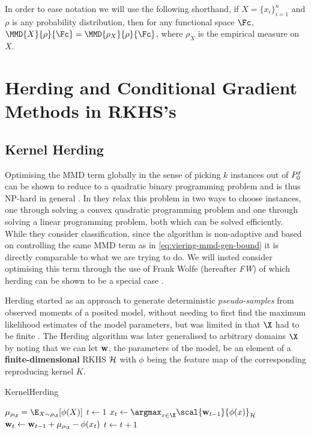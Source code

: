 In order to ease notation we will use the following shorthand, if \(X =
\{x_i\}_{i=1}^n\) and \(\rho\) is any probability distribution, then for any
functional space \(\Fc\), \(\MMD{X}{\rho}{\Fc} =
\MMD{\rho_X}{\rho}{\Fc}\), where \(\rho_X\) is the empirical measure
on \(X\).

\section{Herding and Conditional Gradient Methods in RKHS's}
\subsection{Kernel Herding}
Optimising the MMD term globally in the sense of
picking \(k\) instances out of \(P^x_{0}\) can be shown to reduce to a
quadratic binary programming problem and is thus NP-hard in general
\cite{chaovalitwongse09_quadr_integ_progr}. In
\cite{chattopadhyay13_batch_mode_activ_sampl_based} they relax this problem in
two ways to choose instances, one through solving a convex quadratic programming
problem and one through solving a linear programming problem, both which can be
solved efficiently. While they consider classification, since the algorithm is
non-adaptive and based on controlling the same MMD term as in
\ref{eq:viering-mmd-gen-bound} it is directly comparable to what we are trying
to do. We will insted consider optimising this term through the use of
Frank Wolfe \cite{frank56_algor_quadr_progr,jaggi13_revis_frank_wolfe}
(hereafter \textit{FW}) of which
herding can be shown to be a special case
\cite{bach12_equiv_between_herdin_condit_gradien_algor}.

Herding started as an approach to generate deterministic \emph{pseudo-samples}
from observed moments of a posited model, without needing to first find the
maximum likelihood estimates of the model parameters, but was limited in that
\(\X\) had to be finite \cite{welling09_herdin}. The Herding algorithm was later
generalised to arbitrary domains \(\X\) by
\cite{chen12_super_sampl_from_kernel_herdin} noting that we can let \(\mathbf{w}\),
the parameters of the model, be an element of a \textbf{finite-dimensional} RKHS
\(\mathcal{H}\) with \(\phi\) being the feature map of the corresponding
reproducing kernel \(K\).
\begin{algorithm}
  \caption{KernelHerding}\label{alg:kernel-herding}
  \begin{algorithmic}[1]
     \State $\mu_{\rho_{\X}} = \E_{X \sim
\rho_{\X}}[\phi(X)]$ \State $t \gets 1$  \State $x_{t} \gets
\argmax_{x \in \X} \scal{\mat{w}_{t-1}}{\phi(x)}_{\rkhs{H}}$ \State $\mat{w}_{t}
\gets \mat{w}_{t-1} + \mu_{\rho_{\X}} - \phi(x_{t})$ \State $t \gets t + 1$
\EndWhile
\EndProcedure
  \end{algorithmic}
\end{algorithm}

